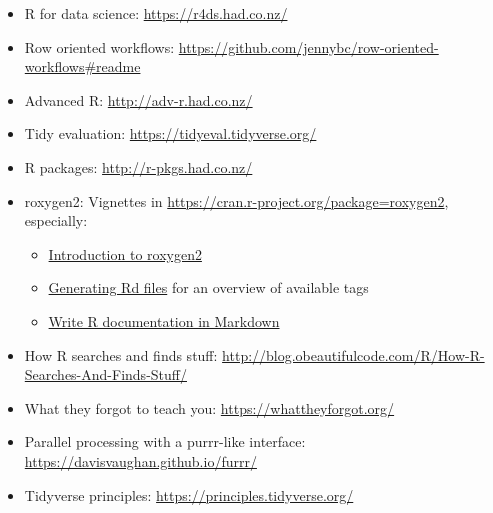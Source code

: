 \documentclass[]{book}
\begin{document}
\begin{itemize}
\item
  R for data science: \url{https://r4ds.had.co.nz/}
\item
  Row oriented workflows: \url{https://github.com/jennybc/row-oriented-workflows\#readme}
\item
  Advanced R: \url{http://adv-r.had.co.nz/}
\item
  Tidy evaluation: \url{https://tidyeval.tidyverse.org/}
\item
  R packages: \url{http://r-pkgs.had.co.nz/}
\item
  roxygen2: Vignettes in \url{https://cran.r-project.org/package=roxygen2}, especially:

  \begin{itemize}
  \item
    \href{https://cran.r-project.org/web/packages/roxygen2/vignettes/roxygen2.html}{Introduction to roxygen2}
  \item
    \href{https://cran.r-project.org/web/packages/roxygen2/vignettes/rd.html}{Generating Rd files} for an overview of available tags
  \item
    \href{https://cran.r-project.org/web/packages/roxygen2/vignettes/markdown.html}{Write R documentation in Markdown}
  \end{itemize}
\item
  How R searches and finds stuff: \url{http://blog.obeautifulcode.com/R/How-R-Searches-And-Finds-Stuff/}
\item
  What they forgot to teach you: \url{https://whattheyforgot.org/}
\item
  Parallel processing with a purrr-like interface: \url{https://davisvaughan.github.io/furrr/}
\item
  Tidyverse principles: \url{https://principles.tidyverse.org/}
\end{itemize}
\end{document}
